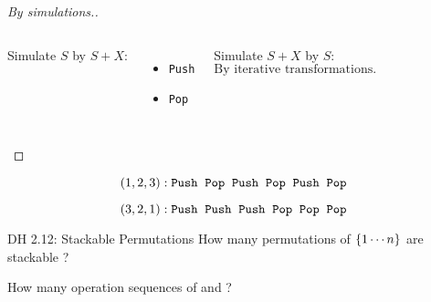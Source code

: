 \begin{frame}{}
  \begin{columns}[b]
  \end{columns}

  \vspace{0.40cm}
  \pause
  \begin{proof}[\large By simulations.]
    \begin{columns}[t]
      \pause
        Simulate $S$ by $S + X$:
	\begin{itemize}
	  \item \texttt{Push}
	  \item \texttt{Pop}
	\end{itemize}
      \pause
        Simulate $S + X$ by $S$:
	\pause
	\[
	  \text{By iterative transformations.}
	\]
    \end{columns}
  \end{proof}
\end{frame}

\begin{frame}{}

  \[
    (1, 2, 3): \texttt{Push}{}\;\; \texttt{Pop}{}\;\; \texttt{Push}{}\;\; \texttt{Pop}{}\;\; \texttt{Push}{}\;\; \texttt{Pop}{}\;\;
  \]

  \[
    (3, 2, 1): \texttt{Push}{}\;\;\texttt{Push}{}\;\;\texttt{Push}{}\;\;\texttt{Pop}{}\;\;\texttt{Pop}{}\;\;\texttt{Pop}{}\;\;
  \]
\end{frame}

\begin{frame}{}
  \begin{exampleblock}{DH 2.12: Stackable Permutations}
    How many permutations of $\{1 \cdots n\}$ are stackable ?
  \end{exampleblock}


  \pause
  \centerline{ How many  operation sequences of  and ?}
\end{frame}

